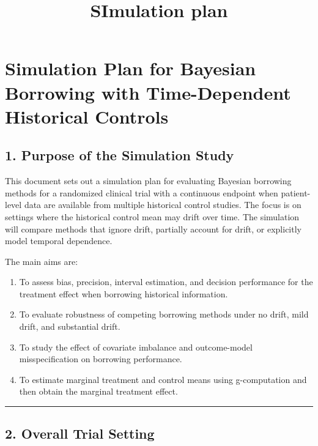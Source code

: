 \documentclass[
  letterpaper,
  DIV=11,
  numbers=noendperiod]{scrartcl}
\title{SImulation plan}
\author{}
\date{}
\providecommand{\tightlist}{%
  \setlength{\itemsep}{0pt}\setlength{\parskip}{0pt}}
\begin{document}
\maketitle


\section{Simulation Plan for Bayesian Borrowing with Time-Dependent
Historical
Controls}\label{simulation-plan-for-bayesian-borrowing-with-time-dependent-historical-controls}

\subsection{1. Purpose of the Simulation
Study}\label{purpose-of-the-simulation-study}

This document sets out a simulation plan for evaluating Bayesian
borrowing methods for a randomized clinical trial with a continuous
endpoint when patient-level data are available from multiple historical
control studies. The focus is on settings where the historical control
mean may drift over time. The simulation will compare methods that
ignore drift, partially account for drift, or explicitly model temporal
dependence.

The main aims are:

\begin{enumerate}
\def\labelenumi{\arabic{enumi}.}
\tightlist
\item
  To assess bias, precision, interval estimation, and decision
  performance for the treatment effect when borrowing historical
  information.
\item
  To evaluate robustness of competing borrowing methods under no drift,
  mild drift, and substantial drift.
\item
  To study the effect of covariate imbalance and outcome-model
  misspecification on borrowing performance.
\item
  To estimate marginal treatment and control means using g-computation
  and then obtain the marginal treatment effect.
\end{enumerate}

\begin{center}\rule{0.5\linewidth}{0.5pt}\end{center}

\subsection{2. Overall Trial Setting}\label{overall-trial-setting}
\end{document}

